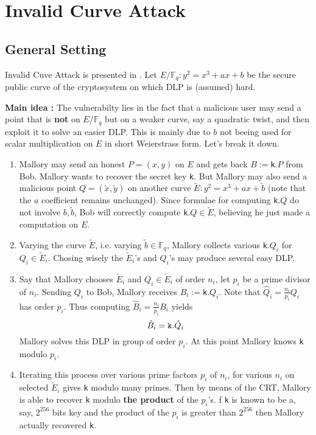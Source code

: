 \documentclass[10pt]{article}
\theoremstyle{definition}
\newcommand{\F}{\mathbb{F}}
\begin{document}
\section{Invalid Curve Attack}
\subsection{General Setting}

Invalid Cuve Attack is presented in \cite{FLRV08}.
Let $E/\F_q : y^2 = x^3+ax+b$ be the secure public curve of the cryptosystem on which DLP is (assumed) hard.

\vspace*{.5cm}
\textbf{Main idea :} The vulnerabilty lies in the fact that a malicious user may send a point that is \textbf{not} on $E/\F_q$ but on a weaker curve, say a quadratic twist, and then exploit it to solve an easier DLP.
This is mainly due to $b$ not beeing used for scalar multiplication on $E$ in short Weierstrass form.
Let's break it down.

\begin{enumerate}
\item Mallory may send an honest $P = (x,y)$ on $E$ and gets back $B:=$\verb|k|$.P$ from Bob.
Mallory wants to recover the secret key \verb|k|.
But Mallory may also send a malicious point $Q = ( \tilde{x},\tilde{y})$ 
on another curve $\tilde{E} : y^2 = x^3+ax+\tilde{b}$ (note that the $a$ coefficient remains unchanged).
Since formulae for computing \verb|k|$.Q$ do not involve $b, \tilde{b}$, Bob will correctly compute \verb|k|$.Q \in \tilde{E}$, believing he just made a computation on $E$.
\item Varying the curve $\tilde{E}$,  i.e. varying $\tilde{b} \in \F_q$, Mallory collects various \verb|k|$.Q_i$ for $Q_i \in \tilde{E}_i$.
Chosing wisely the $\tilde{E}_i$'s and $Q_i$'s may produce several easy DLP.
\item Say that Mallory chooses $\tilde{E}_i$ and  $Q_i \in \tilde{E}_i$ of order $n_i$, let $p_i$ be a prime divisor of $n_i$.
Sending $Q_i$ to Bob, Mallory receives $B_i:=$\verb|k|$.Q_i$.
Note that $\hat{Q}_i=\frac{n_i}{p_i}Q_i$ has order $p_i$.
Thus computing $\hat{B}_i=\frac{n_i}{p_i}B_i$ yields
\[ \hat{B}_i =  \verb|k|.\hat{Q}_i\]
Mallory solves this DLP in group of order $p_i$.
At this point Mallory knows \verb|k| modulo $p_i$. 
\item Iterating this process over various prime factors $p_i$ of $n_i$, for various $n_i$ on selected $\tilde{E}_i$ gives \verb|k| modulo many primes.
Then by means of the CRT, Mallory is able to recover \verb|k| modulo \textbf{the product} of the $p_i$'s.
f \verb|k| is known to be a, say, $2^{256}$ bits key and the product of the $p_i$ is greater than $2^{256}$ then Mallory actually recovered  \verb|k|.
\end{enumerate}
\end{document}
